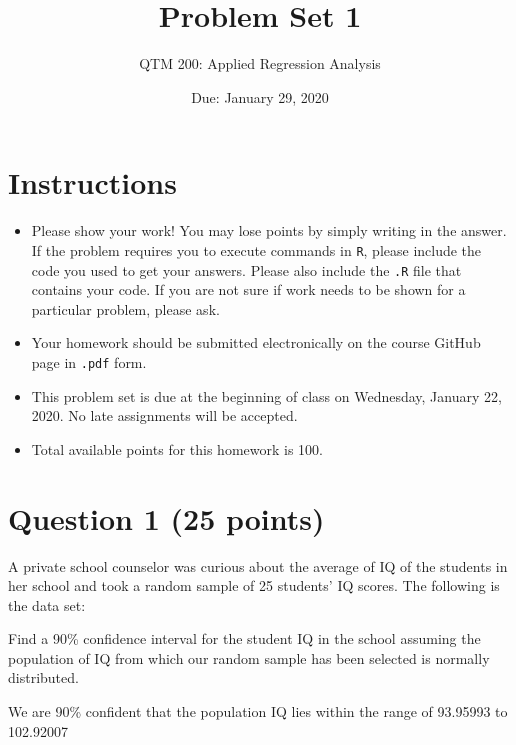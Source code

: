 \documentclass[12pt,letterpaper]{article}
\title{Problem Set 1}
\date{Due: January 29, 2020}
\author{QTM 200: Applied Regression Analysis}
\begin{document}
	\maketitle
	
	\section*{Instructions}
	\begin{itemize}
		\item Please show your work! You may lose points by simply writing in the answer. If the problem requires you to execute commands in \texttt{R}, please include the code you used to get your answers. Please also include the \texttt{.R} file that contains your code. If you are not sure if work needs to be shown for a particular problem, please ask.
		\item Your homework should be submitted electronically on the course GitHub page in \texttt{.pdf} form.
		\item This problem set is due at the beginning of class on Wednesday, January 22, 2020. No late assignments will be accepted.
		\item Total available points for this homework is 100.
	\end{itemize}
	
	\vspace{1cm}
	\section*{Question 1 (25 points)}
	
	A private school counselor was curious about the average of IQ of the students in her school and took a random sample of 25 students' IQ scores. The following is the data set:
	\vspace{.5cm}
	
	
	
	\vspace{.5cm}
	
	\noindent Find a 90\% confidence interval for the student IQ in the school assuming the population of IQ from which our random sample has been selected is normally distributed. 
	
	
	
	\noindent We are 90\% confident that the population IQ lies within the range of 93.95993 to 102.92007
	 
\end{document}
